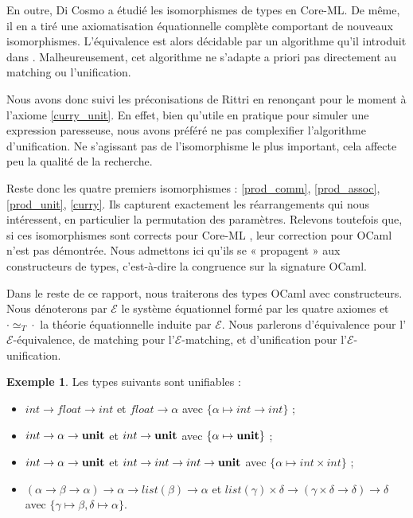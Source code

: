 \documentclass[a4paper]{report}
\theoremstyle{definition}
\newtheorem{exemple}[theoreme]{Exemple}
\newcommand{\unit}{\bold{unit}}
\newcommand{\E}{\mathscr E}
\newcommand{\Tequiv}{\simeq_T}
\begin{document}
En outre, Di Cosmo \cite{DiCosmo92} a étudié les isomorphismes de types en Core-ML. De même, il en a tiré une axiomatisation équationnelle complète comportant de nouveaux isomorphismes. L'équivalence est alors décidable par un algorithme qu'il introduit dans \cite{DiCosmo95}. Malheureusement, cet algorithme ne s'adapte a priori pas directement au matching ou l'unification.

Nous avons donc suivi les préconisations de Rittri en renonçant pour le moment à l'axiome \eqref{curry_unit}. En effet, bien qu'utile en pratique pour simuler une expression paresseuse, nous avons préféré ne pas complexifier l'algorithme d'unification. Ne s'agissant pas de l'isomorphisme le plus important, cela affecte peu la qualité de la recherche.

Reste donc les quatre premiers isomorphismes : \eqref{prod_comm}, \eqref{prod_assoc}, \eqref{prod_unit}, \eqref{curry}. Ils capturent exactement les réarrangements qui nous intéressent, en particulier la permutation des paramètres. Relevons toutefois que, si ces isomorphismes sont corrects pour Core-ML \cite{DiCosmo93}, leur correction pour OCaml n'est pas démontrée. Nous admettons ici qu'ils se « propagent » aux constructeurs de types, c'est-à-dire la congruence sur la signature OCaml.

Dans le reste de ce rapport, nous traiterons des types OCaml avec constructeurs. Nous dénoterons par $\E$ le système équationnel formé par les quatre axiomes et $\cdot \Tequiv \cdot$ la théorie équationnelle induite par $\E$. Nous parlerons d'équivalence pour l'$\E$-équivalence, de matching pour l'$\E$-matching, et d'unification pour l'$\E$-unification.

\begin{exemple}
	Les types suivants sont unifiables :
	\begin{itemize}
		\item $int \rightarrow float \rightarrow int$ et $float \rightarrow \alpha$ avec $\{ \alpha \mapsto int \rightarrow int \}$ ;
		\item $int \rightarrow \alpha \rightarrow \unit$ et $int \rightarrow \unit$ avec $\{ \alpha \mapsto \unit \}$ ;
		\item $int \rightarrow \alpha \rightarrow \unit$ et $int \rightarrow int \rightarrow int \rightarrow \unit$ avec $\{ \alpha \mapsto int \times int \}$ ;
		\item $(\alpha \rightarrow \beta \rightarrow \alpha) \rightarrow \alpha \rightarrow list (\beta) \rightarrow \alpha$ et $list (\gamma) \times \delta \rightarrow (\gamma \times \delta \rightarrow \delta) \rightarrow \delta$ \\ avec $\{ \gamma \mapsto \beta, \delta \mapsto \alpha \}$.
	\end{itemize}
\end{exemple}
\end{document}
